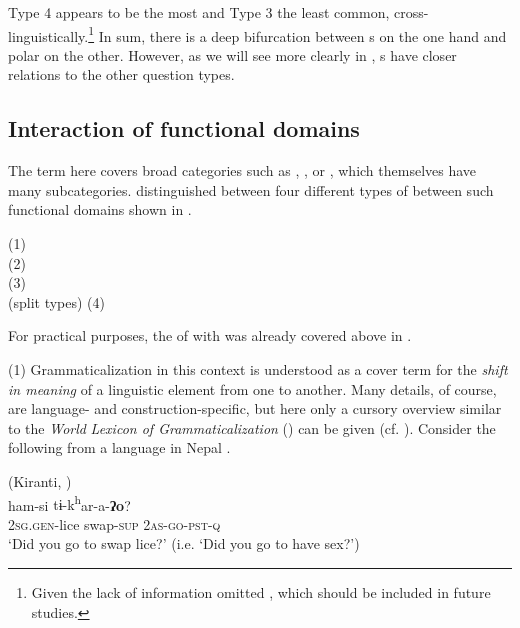 Type 4 appears to be the most and Type 3 the least common, cross-linguistically.\footnote{Given the lack of information \cite{Hölzl2015b} omitted , which should be included in future studies.} In sum, there is a deep bifurcation between s on the one hand and polar  on the other. However, as we will see more clearly in , s have closer relations to the other question types.

\subsection{Interaction of functional domains}\label{sec:4.2.3}

The term \textit{} here covers broad  categories such as , , or , which themselves have many subcategories. \cite[24]{Hölzl2016a} distinguished between four different types of  between such functional domains shown in .

\ea\upshape%
    \label{ex:4:29}
    \ea
       (1)\\

    \ex
       (2)\\

    \ex
       (3)\\

    \ex
       (split types) (4)\\

    \z
    \z 

\noindent For practical purposes, the  of  with  was already covered above in .

         (1) Grammaticalization in this context is understood as a cover term for the \textit{shift in meaning} of a linguistic element from one  to another. Many details, of course, are language- and construction-specific, but here only a cursory overview similar to the \textit{World} \textit{Lexicon of  Grammaticalization} (\citealt{Heine2002}) can be given (cf. \citealt{Hölzl2015b}). Consider the following  from a language in Nepal .

\ea%
    \label{ex:4:30}
     (Kiranti, )\\
     ham-si {tɨ-k\textsuperscript{h}}{ar-a-}\textbf{{ʔo}}?\\
    2\textsc{sg.gen}-lice  swap-\textsc{sup}  2\textsc{as}-\textsc{go}-\textsc{pst}-\textsc{q}\\
    \glt ‘Did you go to swap lice?’ (i.e. ‘Did you go to have sex?’) \citep[205]{Doornenbal2009}
    \z

